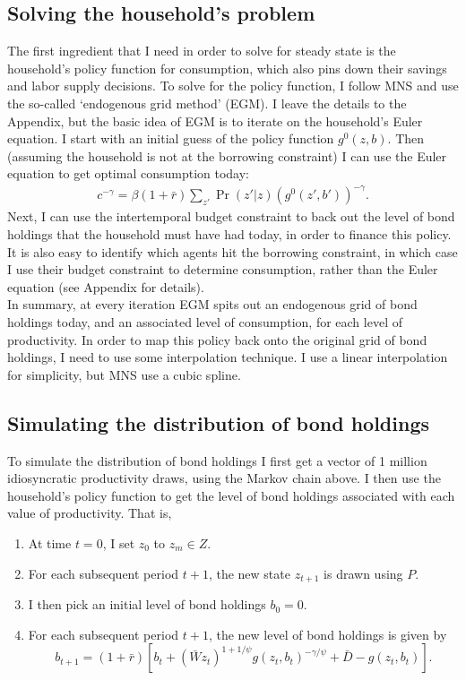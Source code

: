\documentclass[12pt]{article}
\newcommand{\mtx}[1]{\ensuremath{\bm{\mathit{#1}}}}
\begin{document}
\subsection{Solving the household's problem}
The first ingredient that I need in order to solve for steady state is the household's policy function for consumption, which also pins down their savings and labor supply decisions. To solve for the policy function, I follow MNS and use the so-called `endogenous grid method' (EGM). I leave the details to the Appendix, but the basic idea of EGM is to iterate on the household's Euler equation. I start with an initial guess of the policy function $g^0(z,b)$. Then (assuming the household is not at the borrowing constraint) I can use the Euler equation to get optimal consumption today:
\begin{align*}
c^{-\gamma} = \beta(1+\bar r) \sum_{z'}\Pr(z'|z)(g^0(z',b'))^{-\gamma}.
\end{align*}
Next, I can use the intertemporal budget constraint to back out the level of bond holdings that the household must have had today, in order to finance this policy. It is also easy to identify which agents hit the borrowing constraint, in which case I use their budget constraint to determine consumption, rather than the Euler equation (see Appendix for details). \\

In summary, at every iteration EGM spits out an endogenous grid of bond holdings today, and an associated level of consumption, for each level of productivity. In order to map this policy back onto the original grid of bond holdings, I need to use some interpolation technique. I use a linear interpolation for simplicity, but MNS use a cubic spline.

\subsection{Simulating the distribution of bond holdings}
To simulate the distribution of bond holdings I first get a vector of 1 million idiosyncratic productivity draws, using the Markov chain above. I then use the household's policy function to get the level of bond holdings associated with each value of productivity. That is,
\begin{enumerate}
\item At time $t=0$, I set $z_0$ to $z_m \in Z$.
\item For each subsequent period $t+1$, the new state $z_{t+1}$ is drawn using $\mtx{P}$.
\item I then pick an initial level of bond holdings $b_0 = 0$.
\item For each subsequent period $t+1$, the new level of bond holdings is given by $$b_{t+1} = (1+\bar r)[b_t+(\bar{W}z_t)^{1+1/\psi}g(z_t,b_t)^{-\gamma/\psi}+\bar{D}-g(z_t,b_t)]. $$
\end{enumerate}
\end{document}
